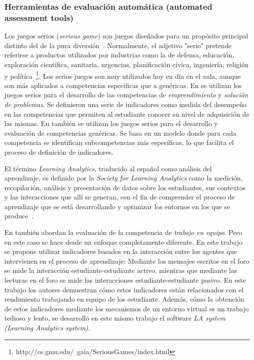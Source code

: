 
\subsubsection{Herramientas de evaluación automática (automated assessment tools)}

Los juegos serios (\emph{serious game}) son juegos diseñados para un propósito principal distinto del de la pura diversión~\cite{djaouti2011classifying}. Normalmente, el adjetivo "serio" pretende referirse a productos utilizados por industrias como la de defensa, educación, exploración científica, sanitaria, urgencias, planificación cívica, ingeniería, religión y política~\footnote{http://cs.gmu.edu/~gaia/SeriousGames/index.html}. Los serios juegos son muy utilizados hoy en día en el aula, aunque son más aplicados a competencias específicas que a genéricas. En \cite{guenaga2013serious} se utilizan los juegos serios para el desarrollo de las competencias de \emph{emprendimiento} y \emph{solución de problemas}. Se definieron una serie de indicadores como medida del desempeño en las competencias que permiten al estudiante conocer su nivel de adquisición de las mismas. En \cite{bedek2011behavioral} también se utilizan los juegos serios para el desarrollo y evaluación de competencias genéricas. Se basa en un modelo donde para cada competencia se identifican subcompetencias más específicas, lo que facilita el proceso de definición de indicadores.

El término \emph{Learning Analytics}, traducido al español como análisis del aprendizaje, es definido por la \emph{Society for Learning Analytics} como la medición, recopilación, análisis y presentación de datos sobre los estudiantes, sus contextos y las interacciones que allí se generan, con el fin de comprender el proceso de aprendizaje que se está desarrollando y optimizar los entornos en los que se produce~\cite{siemens2012learning}.

En \cite{fidalgo:2015} también abordan la evaluación de la competencia de \emph{trabajo en equipo}. Pero en este caso se hace desde un enfoque completamente diferente. En este trabajo se propone utilizar indicadores basados en la interacción entre los agentes que intervienen en el proceso de aprendizaje: Mediante los mensajes escritos en el foro se mide la interacción estudiante-estudiante activo, mientras que mediante las lecturas en el foro se mide las interacciones estudiante-estudiante pasivo. En este trabajo los autores demuestran cómo estos indicadores están relacionados con el rendimiento trabajando en equipo de los estudiante. Además, cómo la obtención de estos indicadores mediante los mecanismos de un entorno virtual es un trabajo tedioso y lento, se desarrolló en este mismo trabajo el software \emph{LA system (Learning Analytics system)}.

